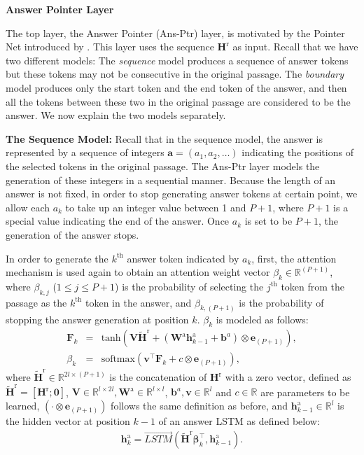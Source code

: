 \documentclass{article} \usepackage{iclr2017_conference,times}
\begin{document}
\noindent \textbf{Answer Pointer Layer}

The top layer, the Answer Pointer (Ans-Ptr) layer, is motivated by the Pointer Net introduced by \citet{vinyals2015pointer:NIPS2015}.
This layer uses the sequence $\mathbf{H}^\text{r}$ as input.
Recall that we have two different models: 
The \emph{sequence} model produces a sequence of answer tokens but these tokens may not be consecutive in the original passage.
The \emph{boundary} model produces only the start token and the end token of the answer, and then all the tokens between these two in the original passage are considered to be the answer.
We now explain the two models separately.

\noindent \textbf{The Sequence Model:} Recall that in the sequence model, the answer is represented by a sequence of integers $\mathbf{a} = (a_1, a_2, \ldots)$ indicating the positions of the selected tokens in the original passage.
The Ans-Ptr layer models the generation of these integers in a sequential manner.
Because the length of an answer is not fixed, in order to stop generating answer tokens at certain point, we allow each $a_k$ to take up an integer value between 1 and $P + 1$, where $P + 1$ is a special value indicating the end of the answer.
Once $a_k$ is set to be $P + 1$, the generation of the answer stops.

In order to generate the $k^\text{th}$ answer token indicated by $a_k$, first, the attention mechanism is used again to obtain an attention weight vector $\beta_k \in \mathbb{R}^{(P + 1)}$, where $\beta_{k, j}$ ($1 \leq j \leq P+1$) is the probability of selecting the $j^\text{th}$ token from the passage as the $k^\text{th}$ token in the answer, and $\beta_{k, (P + 1)}$ is the probability of stopping the answer generation at position $k$.
$\beta_k$ is modeled as follows:
\begin{eqnarray}
\mathbf{F}_k & = & \text{tanh}(\mathbf{V} \widetilde{\mathbf{H}}^\text{r} + (\mathbf{W}^\text{a} \mathbf{h}^\text{a}_{k-1} + \mathbf{b}^a )\otimes \mathbf{e}_{(P + 1)}), \\
\beta_k & = & \text{softmax}(\mathbf{v}^\intercal \mathbf{F}_k + c\otimes \mathbf{e}_{(P + 1)}),
\end{eqnarray}
where $\widetilde{\mathbf{H}}^\text{r} \in \mathbb{R}^{2l \times (P + 1)}$ is the concatenation of $\mathbf{H}^\text{r}$ with a zero vector, defined as $\widetilde{\mathbf{H}}^\text{r} = [\mathbf{H}^\text{r} ; \mathbf{0}]$, $\mathbf{V} \in \mathbb{R}^{l \times 2l}, \mathbf{W}^\text{a} \in \mathbb{R}^{l \times l}$, $\mathbf{b}^a, \mathbf{v} \in \mathbb{R}^l$ and $c \in \mathbb{R}$ are parameters to be learned, $(\cdot \otimes \mathbf{e}_{(P + 1)})$ follows the same definition as before, and $\mathbf{h}^\text{a}_{k-1} \in \mathbb{R}^l$ is the hidden vector at position $k - 1$ of an answer LSTM as defined below:
\begin{eqnarray}
\mathbf{h}^\text{a}_{k} = \overrightarrow{\textit{LSTM}}(\widetilde{\mathbf{H}}^\text{r} \mathbf{\beta}_k^{\intercal},\mathbf{h}^\text{a}_{k-1}).
\end{eqnarray}
\end{document}
